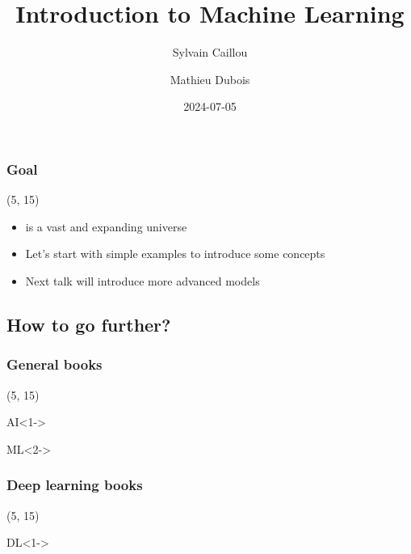 \documentclass[10pt]{beamer}
\title{Introduction to Machine Learning}
\author{Sylvain Caillou \and Mathieu Dubois}
\institute{L2IT}
\date{2024-07-05}
\begin{document}
\frame{\titlepage}

\begin{frame}
  \frametitle{Goal}

  \begin{textblock}{90}(5, 15)
    \begin{itemize}
    \item {} is a vast and expanding universe
    \item Let's start with simple examples to introduce some concepts
    \item Next talk will introduce more advanced models
    \end{itemize}
  \end{textblock}
\end{frame}


\subsection*{How to go further?}

\begin{frame}
  \frametitle{General books}

  \nocite{*}

  \begin{textblock}{90}(5, 15)
    \begin{block}{AI}<1->
      \printbibliography[heading=none,category=AI]
    \end{block}

    \begin{block}{\ac{ML}}<2->
      \printbibliography[heading=none,category=ML]
    \end{block}
  \end{textblock}
\end{frame}

\begin{frame}
  \frametitle{Deep learning books}

  \nocite{*}

  \begin{textblock}{90}(5, 15)
    \begin{block}{DL}<1->
      \printbibliography[heading=none,category=deep_learning]
    \end{block}
  \end{textblock}
\end{frame}
\end{document}
